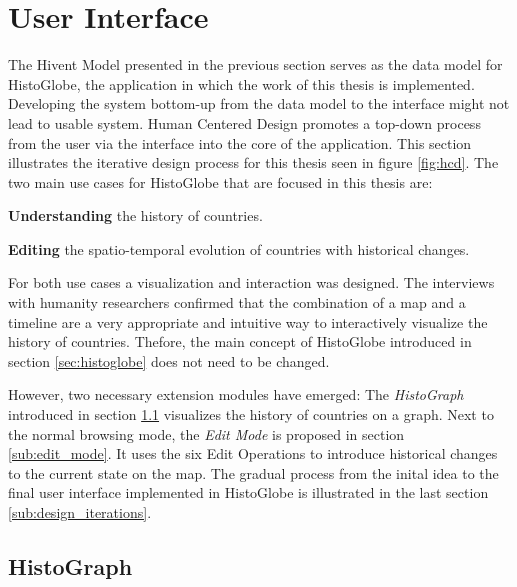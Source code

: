 
\section{User Interface} %
\label{sec:user_interface}

The Hivent Model presented in the previous section serves as the data model for HistoGlobe, the application in which the work of this thesis is implemented. Developing the system bottom-up from the data model to the interface might not lead to usable system. Human Centered Design promotes a top-down process from the user via the interface into the core of the application. This section illustrates the iterative design process for this thesis seen in figure \ref{fig:hcd}. The two main use cases for HistoGlobe that are focused in this thesis are:

\begin{compactenum}
  \item \textbf{Understanding} the history of countries.
  \item \textbf{Editing} the spatio-temporal evolution of countries with historical changes.
\end{compactenum}

For both use cases a visualization and interaction was designed. The interviews with humanity researchers confirmed that the combination of a map and a timeline are a very appropriate and intuitive way to interactively visualize the history of countries. Thefore, the main concept of HistoGlobe introduced in section \ref{sec:histoglobe} does not need to be changed.

However, two necessary extension modules have emerged: The \emph{HistoGraph} introduced in section \ref{sub:histograph} visualizes the history of countries on a graph. Next to the normal browsing mode, the \emph{Edit Mode} is proposed in section \ref{sub:edit_mode}. It uses the six Edit Operations to introduce historical changes to the current state on the map. The gradual process from the inital idea to the final user interface implemented in HistoGlobe is illustrated in the last section \ref{sub:design_iterations}.

\subsection{HistoGraph} %
\label{sub:histograph}

